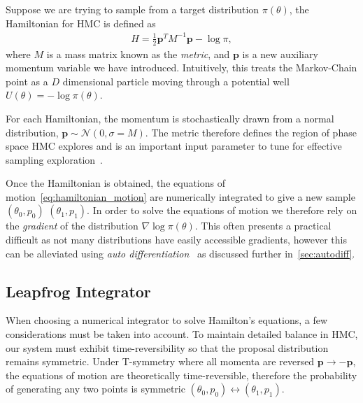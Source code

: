 \documentclass[11pt]{article}
\begin{document}
    Suppose we are trying to sample from a target distribution $\pi(\theta)$, the Hamiltonian for HMC is defined as
    \begin{equation}\label{eq:hmc_hamiltonian}
    \begin{aligned}
        H = \frac{1}{2} \mathbf{p}^T M^{-1} \mathbf{p} - \log \pi,
    \end{aligned}
    \end{equation}
    where $M$ is a mass matrix known as the \emph{metric}, and $\mathbf{p}$ is a new auxiliary momentum variable we have introduced.
    Intuitively, this treats the Markov-Chain point as a $D$ dimensional particle moving through a
    potential well $U(\theta) = -\log \pi(\theta)$.

    For each Hamiltonian, the momentum is stochastically drawn from a normal distribution,
    $\mathbf{p} \sim \mathcal{N}(0, \sigma = M)$.
    The metric therefore defines the region of phase space HMC explores and is an important input parameter to
    tune for effective sampling exploration~\cite{betancourt2016energymetric}.

    Once the Hamiltonian is obtained, the equations of motion~\eqref{eq:hamiltonian_motion} are numerically integrated
    to give a new sample $(\theta_0, p_0)$ \rightarrow $(\theta_1, p_1)$.
    In order to solve the equations of motion we therefore rely on the \emph{gradient} of the
    distribution $\nabla \log \pi(\theta)$.
    This often presents a practical difficult as not many distributions have easily accessible gradients, however this
    can be alleviated using \emph{auto differentiation}~\cite{carpenter2015stan, NEURIPS2020_9332c513, 10.5555/3571885.3571964}
    as discussed further in~\cref{sec:autodiff}.


\subsection{Leapfrog Integrator}\label{subsec:integrator}
    When choosing a numerical integrator to solve Hamilton's equations, a few considerations must be taken into account.
    To maintain detailed balance in HMC, our system must exhibit time-reversibility so that the proposal distribution
    remains symmetric.
    Under T-symmetry where all momenta are reversed $\mathbf{p} \rightarrow -\mathbf{p}$, the equations of motion are
    theoretically time-reversible, therefore the probability of generating any two points is
    symmetric $(\theta_0, p_0) \leftrightarrow (\theta_1, p_1)$.
\end{document}
